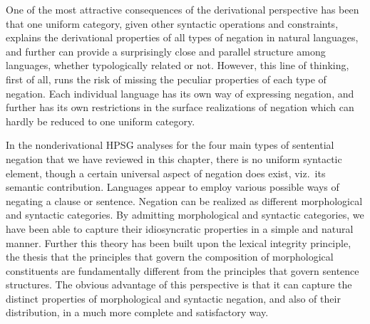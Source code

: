 \documentclass[output=paper
                ,modfonts
		,nonflat
	        ,collection
	        ,collectionchapter
	        ,collectiontoclongg
 	        ,biblatex  
                ,babelshorthands
                ,newtxmath
                ,draftmode
                ,colorlinks, citecolor=brown 
]{./langsci/langscibook}
\begin{document}
{\begin{exe}
\begin{xlist}


One of the most attractive consequences of the
derivational perspective has been that one uniform category,
given other syntactic operations and constraints,
explains the derivational properties of all types of negation
in natural languages, and further can provide a surprisingly
close and parallel structure among languages, whether typologically
related or not. However, this line of thinking, first of all, runs the risk of
missing the peculiar properties of each type of
negation. Each individual language has its own
way of expressing negation, and further has
its own restrictions in the surface realizations of negation which
can hardly be reduced to one uniform category.


In the nonderivational HPSG analyses for the four main
types of sentential negation that we have reviewed
in this chapter,  there is no uniform
syntactic element, though a certain universal aspect of
negation does exist, viz.\ its semantic contribution.
Languages appear to employ various possible
ways of negating a clause or sentence. Negation can
be realized as different morphological and syntactic categories.
By admitting morphological and syntactic categories,
we have been able to capture their idiosyncratic properties in a
simple and natural manner. Further this theory has been built upon
the lexical integrity principle, the thesis that the principles that govern the
composition
of morphological
constituents are fundamentally different from the principles that
govern sentence structures. The obvious advantage of
this perspective is that it can capture the distinct properties of
morphological and syntactic negation, and also of their distribution,
in a much more complete and satisfactory way.



\end{xlist}
\end{exe}}
\end{document}
